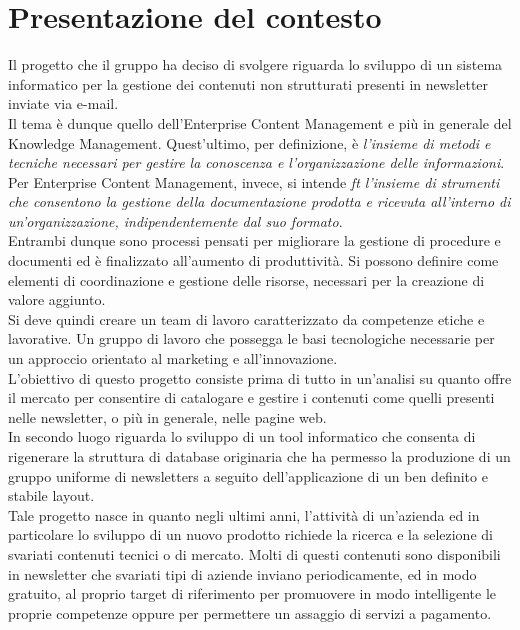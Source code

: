 \section{Presentazione del contesto}
Il progetto che il gruppo \GRUPPO{} ha deciso di svolgere riguarda lo sviluppo di un sistema informatico per la gestione dei contenuti non strutturati presenti in newsletter inviate via e-mail.\\
Il tema è dunque quello dell'Enterprise Content Management e più in generale del Knowledge Management. Quest'ultimo, per definizione, è \textit{l'insieme di metodi e tecniche necessari per gestire la conoscenza e l'organizzazione delle informazioni}. \\
Per Enterprise Content Management, invece, si intende \textit{ft l'insieme di strumenti che consentono la gestione della documentazione prodotta e ricevuta all'interno di un'organizzazione, indipendentemente dal suo formato}.\\
Entrambi dunque sono processi pensati per migliorare la gestione di procedure e documenti ed è finalizzato all'aumento di produttività. Si possono definire come elementi di coordinazione e gestione delle risorse, necessari per la creazione di valore aggiunto.\\
Si deve quindi creare un team di lavoro caratterizzato da competenze etiche e lavorative. Un gruppo di lavoro che possegga le basi tecnologiche necessarie per un approccio orientato al marketing e all'innovazione.\\
L'obiettivo di questo progetto consiste prima di tutto in un'analisi su quanto offre il mercato per consentire di catalogare e gestire i contenuti come quelli presenti nelle newsletter, o più in generale, nelle pagine web.\\
In secondo luogo riguarda lo sviluppo di un tool informatico che consenta di rigenerare la struttura di database originaria che ha permesso la produzione di un gruppo uniforme di newsletters a seguito dell'applicazione di un ben definito e stabile layout.\\
Tale progetto nasce in quanto negli ultimi anni, l'attività di un'azienda ed in particolare lo sviluppo di un nuovo prodotto richiede la ricerca e la selezione di svariati contenuti tecnici o di mercato. Molti di questi contenuti sono disponibili in newsletter che svariati tipi di aziende inviano periodicamente, ed in modo gratuito, al proprio target di riferimento per promuovere in modo intelligente le proprie competenze oppure per permettere un assaggio di servizi a pagamento.\\
